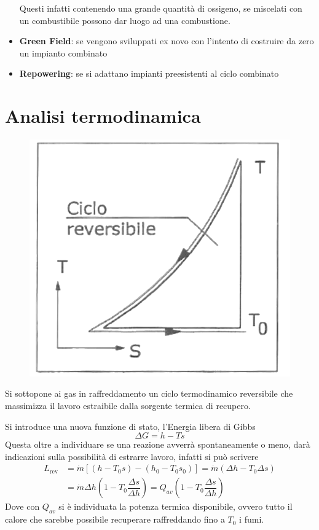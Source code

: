 \begin{adjustwidth}{2in}{}
\begin{itemize}
		Questi infatti contenendo una grande quantità di ossigeno, se miscelati con un combustibile possono dar luogo ad una combustione.
		\item \textbf{Green Field}: se vengono sviluppati ex novo con l'intento di costruire da zero un impianto combinato
		\item \textbf{Repowering}: se si adattano impianti preesistenti al ciclo combinato
	\end{itemize}
\end{adjustwidth}




\section{Analisi termodinamica}
\begin{adjustwidth}{2in}{}
	\begin{figure}[H]
		\centering
		\includegraphics[width=0.5\linewidth]{immagini/impianticombinati1}
		\label{fig:impianticombinati1}
	\end{figure}
	Si sottopone ai gas in raffreddamento un ciclo termodinamico reversibile che massimizza il lavoro estraibile dalla sorgente termica di recupero. \newline 
	
	Si introduce una nuova funzione di stato, l'Energia libera di Gibbs
	\[\Delta G = h-Ts\]
	Questa oltre a individuare se una reazione avverrà spontaneamente o meno, darà indicazioni sulla possibilità di estrarre lavoro, infatti si può scrivere 
	\[\begin{split}
		L_\text{rev} & = \dot{m}[(h-T_0s)-(h_0-T_0s_0)] = \dot{m}(\Delta h - T_0\Delta s) \\ & = \dot{m}\Delta h \left(1-T_0\dfrac{\Delta s}{\Delta h}\right) = Q_{av}\left(1-T_0\dfrac{\Delta s}{\Delta h}\right)
	\end{split}\]
	Dove con $Q_{av}$ si è individuata la potenza termica disponibile, ovvero tutto il calore che sarebbe possibile recuperare raffreddando fino a $T_0$ i fumi. \newline 
	

\end{adjustwidth}
